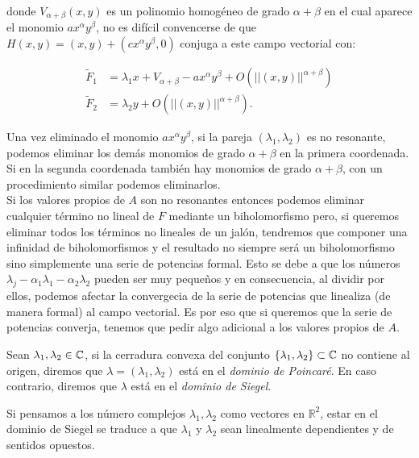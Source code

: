 \noindent donde $V_{\alpha+\beta}(x,y)$ es un polinomio homogéneo de grado $\alpha+\beta$ en el cual aparece el monomio $ax^{\alpha}y^{\beta}$, no es difícil convencerse de que $H(x,y)=(x,y)+(cx^{\alpha}y^{\beta},0)$ conjuga a este campo vectorial con:
 
\begin{equation*}
\begin{aligned}
\tilde{F}_{1} &= \lambda_{1}x + V_{\alpha+\beta}-ax^{\alpha}y^{\beta}+O(||(x,y)||^{\alpha+\beta})\\
\tilde{F}_{2} &= \lambda_{2}y + O(||(x,y)||^{\alpha+\beta}).
\end{aligned}
\end{equation*}

Una vez eliminado el monomio $ax^{\alpha}y^{\beta}$, si la pareja $(\lambda_{1},\lambda_{2})$ es no resonante, podemos eliminar los demás monomios de grado $\alpha+\beta$ en la primera coordenada. Si en la segunda coordenada también hay monomios de grado $\alpha+\beta$, con un procedimiento similar podemos eliminarlos. \\ 
Si los valores propios de $A$ son no resonantes entonces podemos eliminar cualquier término no lineal de $F$ mediante un biholomorfismo pero, si queremos eliminar todos los términos no lineales de un jalón, tendremos que componer una infinidad de biholomorfismos y el resultado no siempre será un biholomorfismo sino simplemente una serie de potencias formal. Esto se debe a que los números $\lambda_{j}-\alpha_{1}\lambda_{1}-\alpha_{2}\lambda_{2}$ pueden ser muy pequeños y en consecuencia, al dividir por ellos, podemos afectar la convergecia de la serie de potencias que linealiza (de manera formal) al campo vectorial. Es por eso que si queremos que la serie de potencias converja, tenemos que pedir algo adicional a los valores propios de $A$.

\begin{defn}
\label{Def:DominioPoincare}
Sean $\lambda_{1},\lambda_{2}\in\mathbb{C}$, si la cerradura convexa del conjunto $\{ \lambda_{1},\lambda_{2}\}\subset\mathbb{C}$ no contiene al origen, diremos que $\lambda=(\lambda_{1},\lambda_{2})$ está en el \emph{dominio de Poincaré}. En caso contrario, diremos que $\lambda$ está en el \emph{dominio de Siegel}.
\end{defn}

Si pensamos a los número complejos $\lambda_{1},\lambda_{2}$ como vectores en $\mathbb{R}^{2}$, estar en el dominio de Siegel se traduce a que $\lambda_{1}$ y $\lambda_{2}$ sean linealmente dependientes y de sentidos opuestos.\\

